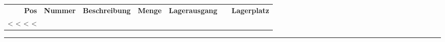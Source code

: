 \documentclass[twoside]{scrartcl}
\begin{document}
\vspace{1cm}

\begin{tabular*}{\textwidth}{@{}rlp{\descrwidth}@{\extracolsep\fill}rcll@{}}
  \textbf{Pos} & \textbf{Nummer} & \textbf{Beschreibung} &
  \textbf{Menge} & \textbf{Lagerausgang} & & \textbf{Lagerplatz} \\
<%
  <%
  <%
<%
\end{tabular*}


\parbox{\textwidth}{
\rule{\textwidth}{2pt}
}
\end{document}
